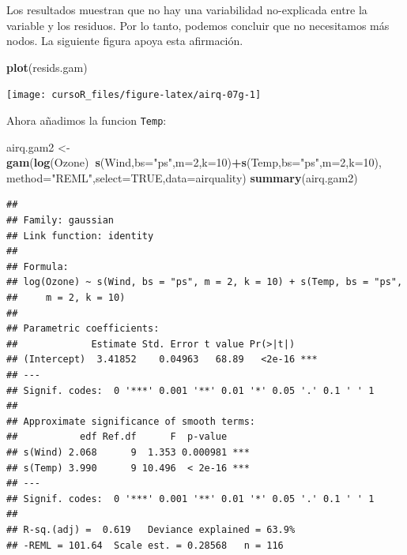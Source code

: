 \documentclass[]{book}
\newenvironment{Shaded}{\begin{snugshade}}{\end{snugshade}}
\newcommand{\KeywordTok}[1]{\textcolor[rgb]{0.13,0.29,0.53}{\textbf{#1}}}
\newcommand{\DataTypeTok}[1]{\textcolor[rgb]{0.13,0.29,0.53}{#1}}
\newcommand{\DecValTok}[1]{\textcolor[rgb]{0.00,0.00,0.81}{#1}}
\newcommand{\StringTok}[1]{\textcolor[rgb]{0.31,0.60,0.02}{#1}}
\newcommand{\OtherTok}[1]{\textcolor[rgb]{0.56,0.35,0.01}{#1}}
\newcommand{\OperatorTok}[1]{\textcolor[rgb]{0.81,0.36,0.00}{\textbf{#1}}}
\newcommand{\NormalTok}[1]{#1}
\begin{document}
Los resultados muestran que no hay una variabilidad no-explicada entre
la variable y los residuos. Por lo tanto, podemos concluir que no
necesitamos más nodos. La siguiente figura apoya esta afirmación.

\begin{Shaded}
\begin{Highlighting}[]
\KeywordTok{plot}\NormalTok{(resids.gam)}
\end{Highlighting}
\end{Shaded}

\begin{center}\texttt{[image: cursoR\_files/figure-latex/airq-07g-1]} \end{center}

Ahora añadimos la funcion \texttt{Temp}:

\begin{Shaded}
\begin{Highlighting}[]
\NormalTok{airq.gam2 <-}\StringTok{ }\KeywordTok{gam}\NormalTok{(}\KeywordTok{log}\NormalTok{(Ozone)}\OperatorTok{~}\KeywordTok{s}\NormalTok{(Wind,}\DataTypeTok{bs=}\StringTok{"ps"}\NormalTok{,}\DataTypeTok{m=}\DecValTok{2}\NormalTok{,}\DataTypeTok{k=}\DecValTok{10}\NormalTok{)}\OperatorTok{+}\KeywordTok{s}\NormalTok{(Temp,}\DataTypeTok{bs=}\StringTok{"ps"}\NormalTok{,}\DataTypeTok{m=}\DecValTok{2}\NormalTok{,}\DataTypeTok{k=}\DecValTok{10}\NormalTok{),}
                 \DataTypeTok{method=}\StringTok{"REML"}\NormalTok{,}\DataTypeTok{select=}\OtherTok{TRUE}\NormalTok{,}\DataTypeTok{data=}\NormalTok{airquality)}
\KeywordTok{summary}\NormalTok{(airq.gam2)}
\end{Highlighting}
\end{Shaded}

\begin{verbatim}
## 
## Family: gaussian 
## Link function: identity 
## 
## Formula:
## log(Ozone) ~ s(Wind, bs = "ps", m = 2, k = 10) + s(Temp, bs = "ps", 
##     m = 2, k = 10)
## 
## Parametric coefficients:
##             Estimate Std. Error t value Pr(>|t|)    
## (Intercept)  3.41852    0.04963   68.89   <2e-16 ***
## ---
## Signif. codes:  0 '***' 0.001 '**' 0.01 '*' 0.05 '.' 0.1 ' ' 1
## 
## Approximate significance of smooth terms:
##           edf Ref.df      F  p-value    
## s(Wind) 2.068      9  1.353 0.000981 ***
## s(Temp) 3.990      9 10.496  < 2e-16 ***
## ---
## Signif. codes:  0 '***' 0.001 '**' 0.01 '*' 0.05 '.' 0.1 ' ' 1
## 
## R-sq.(adj) =  0.619   Deviance explained = 63.9%
## -REML = 101.64  Scale est. = 0.28568   n = 116
\end{verbatim}
\end{document}
